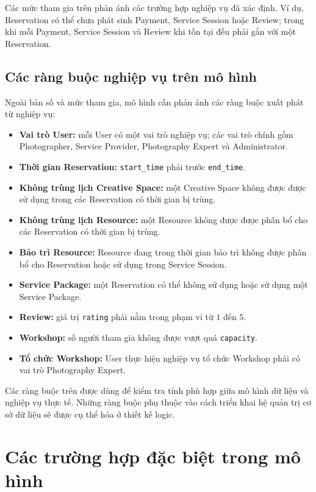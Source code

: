 Các mức tham gia trên phản ánh các trường hợp nghiệp vụ đã xác định. Ví dụ, Reservation có thể chưa phát sinh Payment, Service Session hoặc Review; trong khi mỗi Payment, Service Session và Review khi tồn tại đều phải gắn với một Reservation.

\subsection{Các ràng buộc nghiệp vụ trên mô hình}

Ngoài bản số và mức tham gia, mô hình cần phản ánh các ràng buộc xuất phát từ nghiệp vụ:

\begin{itemize}
	\item \textbf{Vai trò User:} mỗi User có một vai trò nghiệp vụ; các vai trò chính gồm Photographer, Service Provider, Photography Expert và Administrator.
	\item \textbf{Thời gian Reservation:} \texttt{start\_time} phải trước \texttt{end\_time}.
	\item \textbf{Không trùng lịch Creative Space:} một Creative Space không được được sử dụng trong các Reservation có thời gian bị trùng.
	\item \textbf{Không trùng lịch Resource:} một Resource không được được phân bổ cho các Reservation có thời gian bị trùng.
	\item \textbf{Bảo trì Resource:} Resource đang trong thời gian bảo trì không được phân bổ cho Reservation hoặc sử dụng trong Service Session.
	\item \textbf{Service Package:} một Reservation có thể không sử dụng hoặc sử dụng một Service Package.
	\item \textbf{Review:} giá trị \texttt{rating} phải nằm trong phạm vi từ $1$ đến $5$.
	\item \textbf{Workshop:} số người tham gia không được vượt quá \texttt{capacity}.
	\item \textbf{Tổ chức Workshop:} User thực hiện nghiệp vụ tổ chức Workshop phải có vai trò Photography Expert.
\end{itemize}

Các ràng buộc trên được dùng để kiểm tra tính phù hợp giữa mô hình dữ liệu và nghiệp vụ thực tế. Những ràng buộc phụ thuộc vào cách triển khai hệ quản trị cơ sở dữ liệu sẽ được cụ thể hóa ở thiết kế logic.

\section{Các trường hợp đặc biệt trong mô hình}

